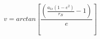 \begin{equation*}
v = arctan [\frac{(\frac{a_{tx}(1 - e^2)}{r_B} - 1)}{e}] \tag{4.67}
\end{equation*}

